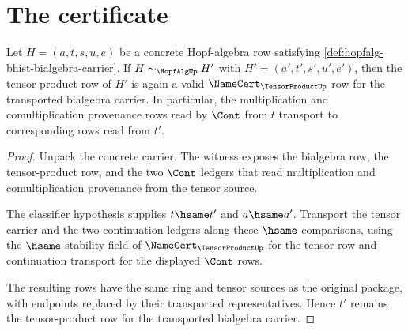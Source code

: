\section{The certificate}
\label{sec:hopfalg-certificate}

\begin{theorem}
\label{thm:hopfalg-tensor-product-row-stability}
Let $H=(a,t,s,u,e)$ be a concrete Hopf-algebra row satisfying \autoref{def:hopfalg-bhist-bialgebra-carrier}. If $H\sim_{\HopfAlgUp}H'$ with $H'=(a',t',s',u',e')$, then the tensor-product row of $H'$ is again a valid $\NameCert_{\TensorProductUp}$ row for the transported bialgebra carrier. In particular, the multiplication and comultiplication provenance rows read by $\Cont$ from $t$ transport to corresponding rows read from $t'$.
\end{theorem}
\begin{proof}
Unpack the concrete carrier. The witness exposes the bialgebra row, the tensor-product row, and the two $\Cont$ ledgers that read multiplication and comultiplication provenance from the tensor source.

The classifier hypothesis supplies $t\hsame t'$ and $a\hsame a'$. Transport the tensor carrier and the two continuation ledgers along these $\hsame$ comparisons, using the $\hsame$ stability field of $\NameCert_{\TensorProductUp}$ for the tensor row and continuation transport for the displayed $\Cont$ rows.

The resulting rows have the same ring and tensor sources as the original package, with endpoints replaced by their transported representatives. Hence $t'$ remains the tensor-product row for the transported bialgebra carrier.
\end{proof}

